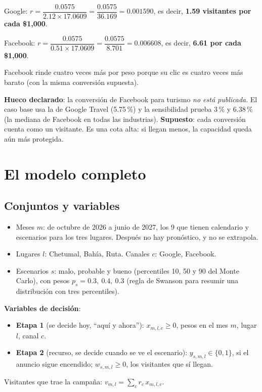 \begin{amano}
Google: $r=\dfrac{0.0575}{2.12\times17.0609}=\dfrac{0.0575}{36.169}=0.001590$, es decir, \textbf{1.59 visitantes por cada
\$1,000}.

Facebook: $r=\dfrac{0.0575}{0.51\times17.0609}=\dfrac{0.0575}{8.701}=0.006608$, es decir, \textbf{6.61 por cada \$1,000}.

Facebook rinde cuatro veces más por peso porque su clic es cuatro veces más barato (con la misma conversión supuesta).
\end{amano}

\textbf{Hueco declarado}: la conversión de Facebook para turismo \emph{no está publicada}. El caso base usa la de Google
Travel (5.75\,\%) y la sensibilidad prueba 3\,\% y 6.38\,\% (la mediana de Facebook en todas las industrias).
\textbf{Supuesto}: cada conversión cuenta como un visitante. Es una cota alta: si llegan menos, la capacidad queda aún más
protegida.

\section{El modelo completo}
\subsection{Conjuntos y variables}
\begin{itemize}
\item Meses $m$: de octubre de 2026 a junio de 2027, los 9 que tienen calendario y escenarios para los tres lugares.
  Después no hay pronóstico, y no se extrapola.
\item Lugares $l$: Chetumal, Bahía, Ruta. Canales $c$: Google, Facebook.
\item Escenarios $s$: malo, probable y bueno (percentiles 10, 50 y 90 del Monte Carlo), con pesos $p_s=0.3,\ 0.4,\ 0.3$
  (regla de Swanson para resumir una distribución con tres percentiles).
\end{itemize}

\textbf{Variables de decisión}:
\begin{itemize}
\item \textbf{Etapa 1} (se decide hoy, ``aquí y ahora''): $x_{m,l,c}\ge0$, pesos en el mes $m$, lugar $l$, canal $c$.
\item \textbf{Etapa 2} (recurso, se decide cuando se ve el escenario): $y_{s,m,l}\in\{0,1\}$, si el anuncio sigue
  encendido; $w_{s,m,l}\ge0$, los visitantes que sí llegan.
\end{itemize}
Visitantes que trae la campaña: $v_{m,l}=\sum_c r_c\,x_{m,l,c}$.

